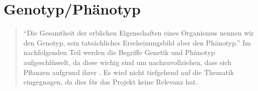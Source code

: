 \section{Genotyp/Phänotyp}
\begin{quote}
\enquote{Die Gesamtheit der erblichen Eigenschaften eines Organismus
nennen wir den Genotyp, sein tatsächliches Erscheinungsbild
aber den Phänotyp.}
\cite[S. 9]{graw2020genetik}
Im nachfolgenden Teil werden die Begriffe Genetik und Phänotyp aufgeschlüsselt, da diese wichig sind um nachzuvollziehen, dass sich Pflanzen aufgrund ihrer . Es wird nicht tiefgehend auf die Thematik eingegnagen, da dies für das Projekt keine Relevanz hat. 
\end{quote}
